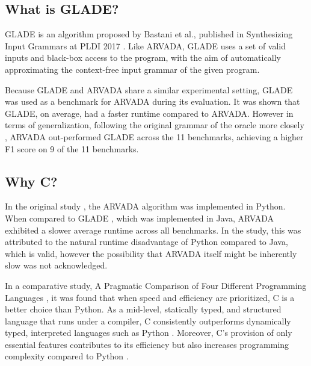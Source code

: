 \subsection{What is GLADE?}
GLADE is an algorithm proposed by Bastani et al., published in Synthesizing Input Grammars at PLDI 2017 \cite{bastaniSynthesizingProgramInput}. Like ARVADA, GLADE uses a set of valid inputs and black-box access to the program, with the aim of automatically approximating the context-free input grammar of the given program.

\vspace{\baselineskip}

Because GLADE and ARVADA share a similar experimental setting, GLADE was used as a benchmark for ARVADA during its evaluation. It was shown that GLADE, on average, had a faster runtime compared to ARVADA. However in terms of generalization, following the original grammar of the oracle more closely , ARVADA out-performed GLADE across the 11 benchmarks, achieving a higher F1 score on 9 of the 11 benchmarks.

\subsection{Why C?}

In the original study \cite{kulkarniLearningHighlyRecursive2021}, the ARVADA algorithm was implemented in Python. When compared to GLADE \cite{bastaniSynthesizingProgramInput}, which was implemented in Java, ARVADA exhibited a slower average runtime across all benchmarks. In the study, this was attributed to the natural runtime disadvantage of Python compared to Java, which is valid, however the possibility that ARVADA itself might be inherently slow was not acknowledged.

\vspace{\baselineskip}

In a comparative study, A Pragmatic Comparison of Four Different Programming Languages \cite{aliPragmaticComparisonFour2021}, it was found that when speed and efficiency are prioritized, C is a better choice than Python. As a mid-level, statically typed, and structured language that runs under a compiler, C consistently outperforms dynamically typed, interpreted languages such as Python \cite{kumarPythonLanguageComparison2022}. Moreover, C’s provision of only essential features contributes to its efficiency but also increases programming complexity compared to Python \cite{aliPragmaticComparisonFour2021, kumarPythonLanguageComparison2022}.

